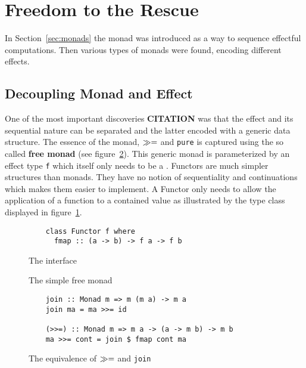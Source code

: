 \section{Freedom to the Rescue}

\label{sec:free}

In Section~\ref{sec:monads} the monad was introduced as a way to
sequence effectful computations. Then various types of monads were
found, encoding different effects.

\subsection{Decoupling Monad and Effect}

\label{sec:introducing-free}

One of the most important discoveries \textbf{CITATION} was that the
effect and its sequential nature can be separated and the latter
encoded with a generic data structure. The essence of the monad,
$\gg=$ and \texttt{pure} is captured using the so called
\textbf{free monad} (see figure~\ref{fig:free-monad}). This generic
monad is parameterized by an effect type \texttt{f} which itself only
needs to be a \Functor{}. Functors are much simpler structures than
monads. They have no notion of sequentiality and continuations which
makes them easier to implement. A Functor only needs to allow the
application of a function to a contained value as illustrated by the
type class \Functor{} displayed in figure~\ref{fig:functor-class}.

\begin{figure}
  \begin{lstlisting}
    class Functor f where
      fmap :: (a -> b) -> f a -> f b
  \end{lstlisting}
  \caption{The \Functor{} interface}
  \label{fig:functor-class}
\end{figure}
\begin{figure}
  
  \caption{The simple free monad}
  \label{fig:free-monad}
\end{figure}
\begin{figure}
  \begin{lstlisting}
    join :: Monad m => m (m a) -> m a
    join ma = ma >>= id

    (>>=) :: Monad m => m a -> (a -> m b) -> m b
    ma >>= cont = join $ fmap cont ma
  \end{lstlisting}
  \caption{The equivalence of $\gg=$ and \texttt{join}}
  \label{fig:join-bind-equivalence}
\end{figure}

